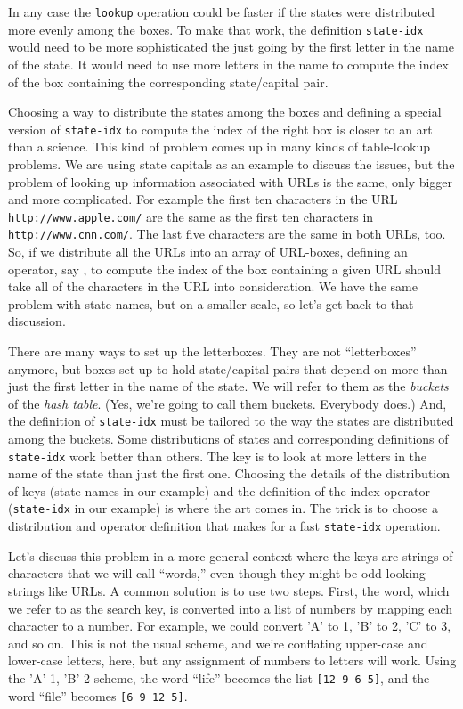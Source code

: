 In any case the \texttt{lookup} operation could be faster
if the states were distributed more evenly among the boxes.
To make that work, the definition
\texttt{state-idx} would need to be more sophisticated
the just going by the first letter in the name of the state.
It would need to use more letters in the name
to compute the index of the box containing the corresponding
state/capital pair.

Choosing a way to distribute the states among the boxes
and defining a special version of \texttt{state-idx}
to compute the index of the right box is closer to an
art than a science. This kind of problem comes up in
many kinds of table-lookup problems. We are using
state capitals as an example to discuss the issues,
but the problem of looking up information associated
with URLs is the same, only bigger and more complicated.
For example the first ten characters in the URL
\texttt{http://www.apple.com/} are the same as the first ten
characters in \texttt{http://www.cnn.com/}. The last five
characters are the same in both URLs, too.
So, if we distribute all the URLs into an array of URL-boxes,
defining an operator, say , to compute the
index of the box containing a given URL should take
all of the characters in the URL into consideration.
We have the same problem with state names, but on a
smaller scale, so let's get back to that discussion.

There are many ways to set up the letterboxes.
They are not ``letterboxes'' anymore, but boxes set up to hold
state/capital pairs that depend
on more than just the first letter in the name of the state.
We will refer to them as the
\emph{buckets}
of the \emph{hash table}.
(Yes, we're going to call them buckets. Everybody does.)
And, the definition of \texttt{state-idx} must be
tailored to the way the states are distributed among the buckets.
Some distributions of states and corresponding definitions
of \texttt{state-idx} work better than others.
The key is to look at more letters in the name of the state
than just the first one.
Choosing the details of the distribution of keys
(state names in our example) and the definition of the index operator
(\texttt{state-idx} in our example) is where the art comes in.
The trick is to choose a distribution and operator
definition that makes for a fast \texttt{state-idx} operation.

Let's discuss this problem in a more general context
where the keys are strings of characters that we will
call ``words,'' even though they might be odd-looking
strings like URLs.
A common solution is to use two steps. First, the word,
which we refer to as the search key, is converted
into a list of numbers by mapping each character to a number. For
example, we could convert 'A' to 1, 'B' to 2, 'C' to 3, and so on.
This is not the usual scheme, and we're conflating upper-case and
lower-case letters, here, but any assignment of numbers to letters
will work.
Using the 'A' 1, 'B' 2 scheme, the word ``life'' becomes the list
\texttt{[12 9 6 5]},
and the word ``file'' becomes \texttt{[6 9 12 5]}.

